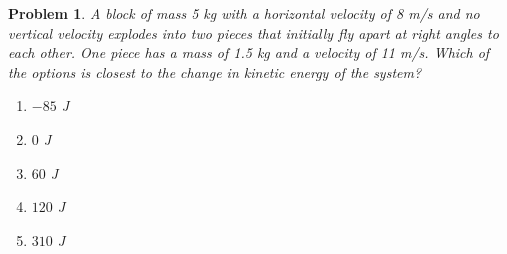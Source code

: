 \documentclass[12pt]{article}
\newcommand{\clearpts}{\addtocounter{tpts}{\value{cpts}} \setcounter{cpts}{0}}
\newcommand{\pts}[1]{\clearpts \setcounter{cpts}{#1}}
\theoremstyle{mystyle}
\newtheorem{pproblem}{Problem}
\begin{document}
\pts{2}
\begin{pproblem}
    A block of mass 5 kg with a horizontal velocity of 8 m/s and no vertical velocity explodes into two pieces that initially fly apart at right angles to each other. One piece has a mass of 1.5 kg and a velocity of 11 m/s. Which of the options is closest to the change in kinetic energy of the system?
    \begin{enumerate}[label=(\Alph*)]
        \item $-85$ J
        \item $0$ J
        \item $60$ J
        \item $120$ J
        \item $310$ J
    \end{enumerate}
\end{pproblem}
\end{document}
